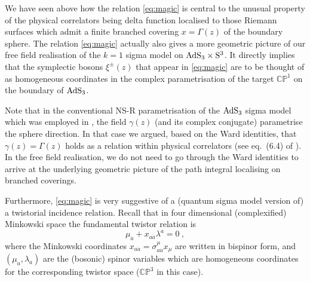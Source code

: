 \documentclass[a4paper,11pt]{article}
\numberwithin{equation}{section}
\begin{document}
We have seen above how the relation \eqref{eq:magic} is central to the unusual property of the physical correlators being delta function localised to those Riemann surfaces which admit a finite branched covering $x=\Gamma(z)$ of the boundary sphere. The relation  \eqref{eq:magic} actually also gives a more geometric picture of our free field realisation of the $k=1$ sigma model on ${\rm AdS}_3\times {\rm S}^3$. It directly implies that the symplectic bosons $\xi^{\pm}(z)$ that appear in \eqref{eq:magic} are to be thought of as homogeneous coordinates in the complex parametrisation of the target $\mathbb{CP}^1$ on the boundary of ${\rm AdS}_3$. 

Note that in the conventional NS-R parametrisation of the ${\rm AdS}_3$ sigma model which was employed in \cite{Eberhardt:2019ywk}, the field $\gamma(z)$ (and its complex conjugate) parametrise the sphere direction. In that case we argued, based on the Ward identities, that $\gamma(z)=\Gamma(z)$ holds as a relation within physical correlators (see eq.~(6.4) of \cite{Eberhardt:2019ywk}). In the free field realisation, we do not need to go through the 
Ward identities to arrive at the underlying geometric picture of the path integral localising on  branched coverings. 

Furthermore, \eqref{eq:magic} is very suggestive of a (quantum sigma model version of) a twistorial incidence relation. Recall that in four dimensional (complexified) Minkowski space the fundamental twistor relation is
\begin{equation}
\mu_{\dot{a}}+x_{a\dot{a}}\lambda^{a}=0 \ ,
\label{twstr-rel}
\end{equation}
where the Minkowski coordinates $x_{a\dot{a}}=\sigma^{\mu}_{a\dot{a}}x_{\mu}$ are written in bispinor form, and $(\mu_{\dot{a}}, \lambda_{a})$ are the (bosonic) spinor variables which are homogeneous coordinates for the corresponding twistor space ($\mathbb{CP}^3$ in this case). 
\end{document}
